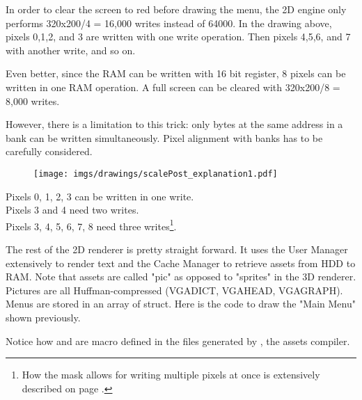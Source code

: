 \par
In order to clear the screen to red before drawing the menu, the 2D engine only performs 320x200/4 = 16,000 writes instead of 64000. In the drawing above, pixels 0,1,2, and 3 are written with one write operation. Then pixels 4,5,6, and 7 with another write, and so on.\\
\par
Even better, since the RAM can be written with 16 bit register, 8 pixels can be written in one RAM operation. A full screen can be cleared with 320x200/8 = 8,000 writes.
\par
\begin{minipage}{\textwidth}

\end{minipage}
However, there is a limitation to this trick: only bytes at the same address in a bank can be written simultaneously. Pixel alignment with banks has to be carefully considered.\
\par
\begin{figure}[H]
\centering
 \texttt{[image: imgs/drawings/scalePost\_explanation1.pdf]}
 
 \end{figure}
Pixels 0, 1, 2, 3 can be written in one write.\\
Pixels 3 and 4 need two writes.\\
Pixels 3, 4, 5, 6, 7, 8 need three writes\footnote{How the mask allows for writing multiple pixels at once is extensively described on page \pageref{simd_vga}.}.\\


\par
The rest of the 2D renderer is pretty straight forward. It uses the User Manager extensively to render text and the Cache Manager to retrieve assets from HDD to RAM. Note that assets are called "pic" as opposed to "sprites" in the 3D renderer. Pictures are all Huffman-compressed (VGADICT, VGAHEAD, VGAGRAPH). Menus are stored in an array of struct. Here is the code to draw the "Main Menu" shown previously.\\

\par
\begin{minipage}{\textwidth}

\end{minipage}

\par
\begin{minipage}{\textwidth}

\end{minipage}
\par
Notice how  and  are macro defined in the files generated by , the assets compiler.


